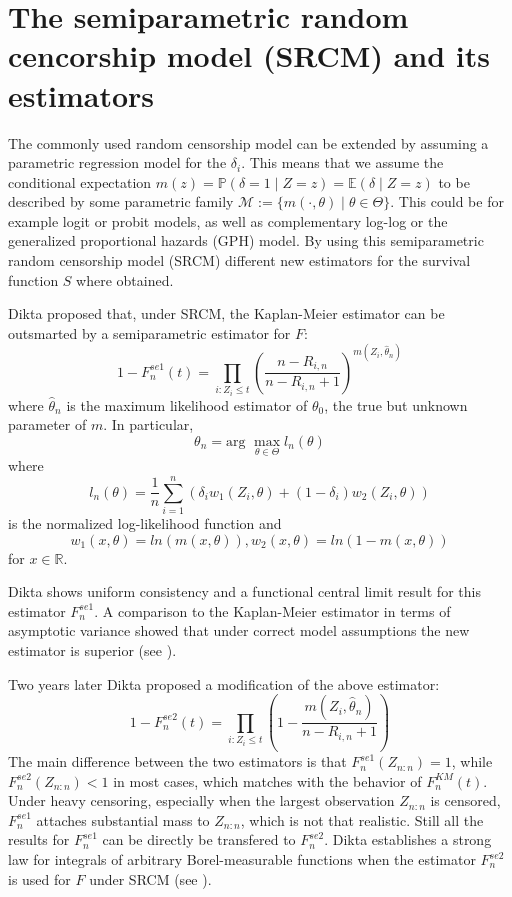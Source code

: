 \section{The semiparametric random cencorship model (SRCM) and its estimators}

The commonly used random censorship model can be extended by assuming a parametric regression model for the $\delta_i$. This means that we assume the conditional expectation $m(z) = \mathbb{P}(\delta = 1\mid Z=z) = \mathbb{E}(\delta \mid Z=z)$ to be described by some parametric family $\mathcal{M}:= \{m(\cdotp,\theta) \mid \theta \in \Theta\}$. This could be for example logit or probit models, as well as complementary log-log or the generalized proportional hazards (GPH) model. 
By using this semiparametric random censorship model (SRCM) different new estimators for the survival function $S$ where obtained.

Dikta proposed that, under SRCM, the Kaplan-Meier estimator can be outsmarted by a semiparametric estimator for $F$:
\begin{equation}\label{fnse1}
1-F_n^{se1}(t) = \prod_{i:Z_i \leq t} \left( \frac{n-R_{i,n}}{n-R_{i,n} + 1} \right)^{m(Z_i,\hat{\theta}_n)}
\end{equation}
where $\hat{\theta}_n$ is the maximum likelihood estimator of $\theta_0$, the true but unknown parameter of $m$.
In particular,
\[
\theta_n = \text{arg }\max_{\theta \in \Theta} l_n(\theta)
\]
where 
\[
l_n(\theta) = \frac{1}{n} \sum_{i=1}^{n} \left( \delta_i w_1(Z_i,\theta) + (1-\delta_i) w_2(Z_i,\theta) \right)
\]
is the normalized log-likelihood function and
\[
w_1(x,\theta) = ln(m(x,\theta)),
w_2(x,\theta) = ln(1-m(x,\theta)) 
\]
for $x \in \mathbb{R}$.

Dikta shows uniform consistency and a functional central limit result for this estimator $F_n^{se1}$. A comparison to the Kaplan-Meier estimator in terms of asymptotic variance showed that under correct model assumptions the new estimator is superior (see \cite{PAPER2}).

Two years later Dikta proposed a modification of the above estimator:
\begin{equation}\label{fnse2}
1-F_n^{se2}(t) = \prod_{i:Z_i \leq t} \left( 1 - \frac{m(Z_i,\hat{\theta}_n)}{n-R_{i,n} + 1} \right)
\end{equation}
The main difference between the two estimators is that $F_n^{se1}(Z_{n:n}) = 1$, while $F_n^{se2}(Z_{n:n}) < 1$ in most cases, which matches with the behavior of $F_n^{KM}(t)$. Under heavy censoring, especially when the largest observation $Z_{n:n}$ is censored, $F_n^{se1}$ attaches substantial mass to $Z_{n:n}$, which is not that realistic. Still all the results for $F_n^{se1}$ can be directly be transfered to $F_n^{se2}$. 
Dikta establishes a strong law for integrals of arbitrary Borel-measurable functions when the estimator $F_n^{se2}$ is used for $F$ under SRCM (see \cite{PAPER3}).

